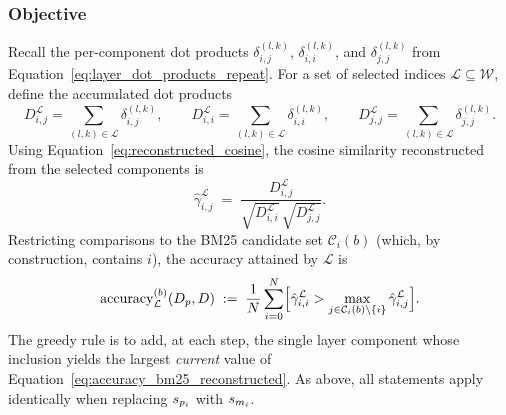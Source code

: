 \subsubsection{Objective}
Recall the per-component dot products $\delta^{(l,k)}_{i,j}$, $\delta^{(l,k)}_{i,i}$, and $\delta^{(l,k)}_{j,j}$ from Equation~\ref{eq:layer_dot_products_repeat}. For a set of selected indices $\mathcal{L}\subseteq\mathcal{W}$, define the accumulated dot products
\[
D^{\mathcal{L}}_{i,j}=\sum_{(l,k)\in\mathcal{L}}\delta^{(l,k)}_{i,j},\qquad
D^{\mathcal{L}}_{i,i}=\sum_{(l,k)\in\mathcal{L}}\delta^{(l,k)}_{i,i},\qquad
D^{\mathcal{L}}_{j,j}=\sum_{(l,k)\in\mathcal{L}}\delta^{(l,k)}_{j,j}.
\]
Using Equation~\ref{eq:reconstructed_cosine}, the cosine similarity reconstructed from the selected components is
\[
\hat{\gamma}^{\mathcal{L}}_{i,j}
\;=\;
\frac{D^{\mathcal{L}}_{i,j}}
     {\sqrt{D^{\mathcal{L}}_{i,i}}\,
      \sqrt{D^{\mathcal{L}}_{j,j}}}.
\]
Restricting comparisons to the BM25 candidate set $\mathcal{C}_i(b)$ (which, by construction, contains $i$), the accuracy attained by $\mathcal{L}$ is
\begin{equation}
\operatorname{accuracy}^{(b)}_{\mathcal{L}}(D_p,D)
\;:=\;
\frac{1}{N}\sum_{i=0}^{N}
\Bigl[
\hat{\gamma}^{\mathcal{L}}_{i,i}
>
\max_{j\in\mathcal{C}_i(b)\setminus\{i\}}
\hat{\gamma}^{\mathcal{L}}_{i,j}
\Bigr].
\label{eq:accuracy_bm25_reconstructed}
\end{equation}
The greedy rule is to add, at each step, the single layer component whose inclusion yields the largest \emph{current} value of Equation~\ref{eq:accuracy_bm25_reconstructed}. As above, all statements apply identically when replacing $s_{p_i}$ with $s_{m_i}$.

